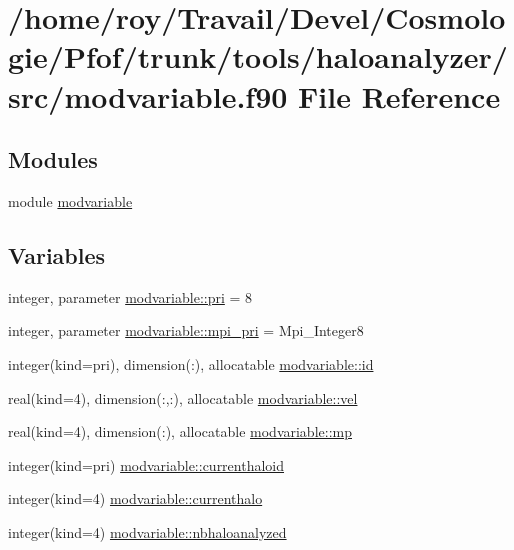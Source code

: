 \hypertarget{haloanalyzer_2src_2modvariable_8f90}{}\section{/home/roy/\+Travail/\+Devel/\+Cosmologie/\+Pfof/trunk/tools/haloanalyzer/src/modvariable.f90 File Reference}
\label{haloanalyzer_2src_2modvariable_8f90}
\subsection*{Modules}
\begin{DoxyCompactItemize}
\item 
module \hyperlink{namespacemodvariable}{modvariable}
\end{DoxyCompactItemize}
\subsection*{Variables}
\begin{DoxyCompactItemize}
\item 
integer, parameter \hyperlink{namespacemodvariable_aa1399b6a91a8f18eb517445b0af8533e}{modvariable\+::pri} = 8
\item 
integer, parameter \hyperlink{namespacemodvariable_aad67fc4a7991eb6a3b666b4e42222117}{modvariable\+::mpi\+\_\+pri} = Mpi\+\_\+\+Integer8
\item 
integer(kind=pri), dimension(\+:), allocatable \hyperlink{namespacemodvariable_a2ab9f2b8f1081802eb503297c0a7372e}{modvariable\+::id}
\item 
real(kind=4), dimension(\+:,\+:), allocatable \hyperlink{namespacemodvariable_a831a3150acc512605f816895b63eab56}{modvariable\+::vel}
\item 
real(kind=4), dimension(\+:), allocatable \hyperlink{namespacemodvariable_abf22a007c4b2e71142484c3fe7a4977f}{modvariable\+::mp}
\item 
integer(kind=pri) \hyperlink{namespacemodvariable_a2bd6e10da8b4481e4b7731bc57037659}{modvariable\+::currenthaloid}
\item 
integer(kind=4) \hyperlink{namespacemodvariable_af627e6ef340449e8897ec09697c8490c}{modvariable\+::currenthalo}
\item 
integer(kind=4) \hyperlink{namespacemodvariable_ad881d35cf1a421a6a1c86b87c50c8810}{modvariable\+::nbhaloanalyzed}
\end{DoxyCompactItemize}
